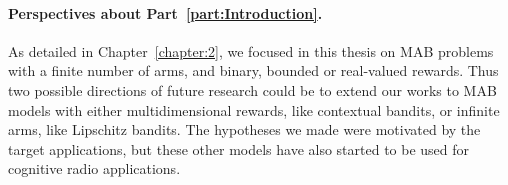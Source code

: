 \paragraph{Perspectives about \textbf{Part~\ref{part:Introduction}}.}



As detailed in Chapter~\ref{chapter:2}, we focused in this thesis on MAB problems with a finite number of arms, and binary, bounded or real-valued rewards.
Thus two possible directions of future research could be to extend our works
to MAB models with either multidimensional rewards, like contextual bandits, or infinite arms, like Lipschitz bandits.
The hypotheses we made were motivated by the target applications, but these other models have also started to be used for cognitive radio applications.



